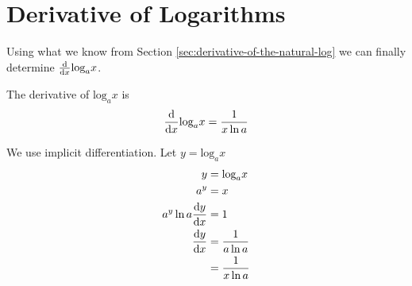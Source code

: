 \documentclass[working]{tuftebook}
\begin{document}
\section{Derivative of Logarithms}
Using what we know from Section \ref{sec:derivative-of-the-natural-log} we can finally determine $ \dv{}{x} \text{log}_{a}x$. 
\begin{theorem}
    The derivative of $ \text{log}_{a}x$ is 
    \[
        \dv{}{x} \text{log}_{a}x= \frac{1}{x \ln a}
    \]
\end{theorem}
\begin{myproof}
    We use implicit differentiation. Let $y= \text{log}_{a}x$
    \begin{align*}
        y&= \text{log}_{a}x\\ 
        a^y&=x\\ 
        a^y \ln a \dv{y}{x}&= 1\\ 
        \dv{y}{x}&= \frac{1}{a \ln a}\\ 
                 &= \frac{1}{x \ln a} 
    \end{align*}
\end{myproof}
\end{document}
